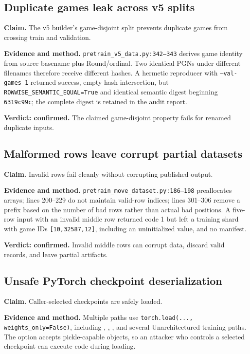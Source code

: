 \documentclass[conference]{IEEEtran}
\newcommand{\code}[1]{\texttt{\small #1}}
\begin{document}
\subsection{Duplicate games leak across v5 splits}
\textbf{Claim.} The v5 builder's game-disjoint split prevents duplicate games from crossing train and validation.

\textbf{Evidence and method.} \code{pretrain\_v5\_data.py:342--343} derives game identity from source basename plus Round/ordinal. Two identical PGNs under different filenames therefore receive different hashes. A hermetic reproducer with \code{--val-games 1} returned success, empty hash intersection, but \code{ROWWISE\_SEMANTIC\_EQUAL=True} and identical semantic digest beginning \code{6319c99c}; the complete digest is retained in the audit report.

\textbf{Verdict: confirmed.} The claimed game-disjoint property fails for renamed duplicate inputs.

\subsection{Malformed rows leave corrupt partial datasets}
\textbf{Claim.} Invalid rows fail cleanly without corrupting published output.

\textbf{Evidence and method.} \code{pretrain\_move\_dataset.py:186--198} preallocates arrays; lines 200--229 do not maintain valid-row indices; lines 301--306 remove a prefix based on the number of bad rows rather than actual bad positions. A five-row input with an invalid middle row returned code 1 but left a training shard with game IDs \code{[10,32587,12]}, including an uninitialized value, and no manifest.

\textbf{Verdict: confirmed.} Invalid middle rows can corrupt data, discard valid records, and leave partial artifacts.

\subsection{Unsafe PyTorch checkpoint deserialization}
\textbf{Claim.} Caller-selected checkpoints are safely loaded.

\textbf{Evidence and method.} Multiple paths use \code{torch.load(..., weights\_only=False)}, including , , , and several Unarchitectured training paths. The option accepts pickle-capable objects, so an attacker who controls a selected checkpoint can execute code during loading.
\end{document}
